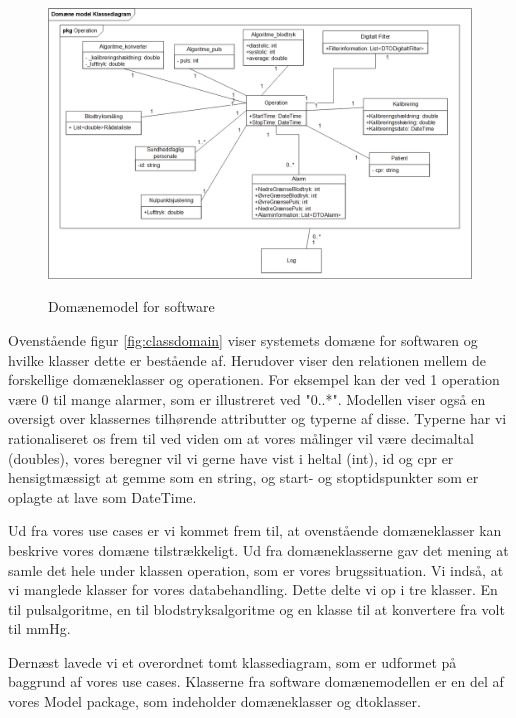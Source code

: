 \clearpage

\begin{figure}[h!]
	\centering
	\includegraphics[width=1\linewidth]{Arkitektur_og_design/Softwarearkitektur/classdomain}
	\label{fig:classdomain}
	\caption{Domænemodel for software}
\end{figure}

Ovenstående figur \vref{fig:classdomain} viser systemets domæne for softwaren og hvilke klasser dette er bestående af.  Herudover viser den relationen mellem de forskellige domæneklasser og operationen. For eksempel kan der ved 1 operation være 0 til mange alarmer, som er illustreret ved "0..*". Modellen viser også en oversigt over klassernes tilhørende attributter og typerne af disse. Typerne har vi rationaliseret os frem til ved viden om at vores målinger vil være decimaltal (doubles), vores beregner vil vi gerne have vist i heltal (int), id og cpr er hensigtmæssigt at gemme som en string, og start- og stoptidspunkter som er oplagte at lave som DateTime. 

Ud fra vores use cases er vi kommet frem til, at ovenstående domæneklasser kan beskrive vores domæne tilstrækkeligt.  Ud fra domæneklasserne gav det mening at samle det hele under klassen operation, som er vores brugssituation. Vi indså, at vi manglede klasser for vores databehandling. Dette delte vi op i tre klasser. En til pulsalgoritme, en til blodstryksalgoritme og en klasse til at konvertere fra volt til mmHg. 

Dernæst lavede vi et overordnet tomt klassediagram, som er udformet på baggrund af vores use cases. Klasserne fra software domænemodellen er en del af vores Model package, som indeholder domæneklasser og dtoklasser. 

\clearpage

